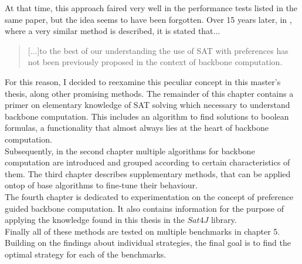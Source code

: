 At that time, this approach faired very well in the performance tests listed in the same paper, but the idea seems to have been forgotten. Over 15 years later, in \cite{PJ18}, where a very similar method is described, it is stated that...
\begin{quotation}
[...]to the best of our understanding the use of SAT with preferences has not been previously proposed in the context of backbone computation.
\end{quotation}

For this reason, I decided to reexamine this peculiar concept in this master's thesis, along other promising methods. The remainder of this chapter contains a primer on elementary knowledge of SAT solving which necessary to understand backbone computation. This includes an algorithm to find solutions to boolean formulas, a functionality that almost always lies at the heart of backbone computation.\\
Subsequently, in the second chapter multiple algorithms for backbone computation are introduced and grouped according to certain characteristics of them. The third chapter describes supplementary methods, that can be applied ontop of base algorithms to fine-tune their behaviour.\\
The fourth chapter is dedicated to experimentation on the concept of preference guided backbone computation. It also contains information for the purpose of applying the knowledge found in this thesis in the $Sat4J$ library. \\
Finally all of these methods are tested on multiple benchmarks in chapter 5. Building on the findings about individual strategies, the final goal is to find the optimal strategy for each of the benchmarks.


\iffalse
Auch noch andere methoden 
normaler ansatz rechnet halt bisschen lösung aus, aber was wenn man die zu steuert ;
TODO introduction
wofür brauche ich backbones

wer hat sich damit beschäftigt

welche paper waren relevant

wie ist die thesis strukturiert, 

was wurde in den sechs monaten gemacht



hab prefbones erfunden

haben prefbones paper rausgesucht

was kann ich mit prefbones noch so anstellen

wie sehen die praktischen nutzen der prefbones varianten aus.



introduction soll aus perspektive vor dem schreiben geschrieben werden (absichten)

extra chap mit related work
nutzen für endnutzer und wirtschaft.
\fi